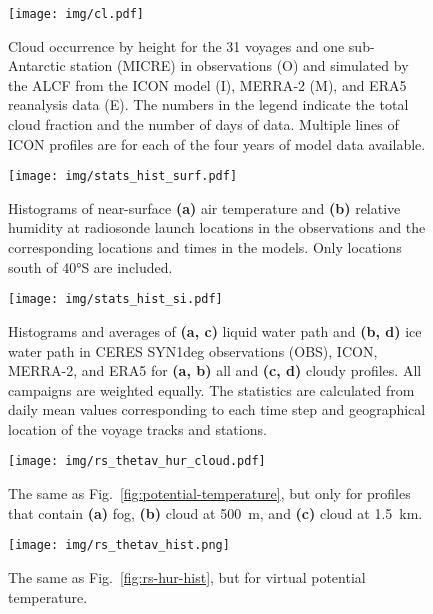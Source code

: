 \documentclass[draft,jgrga]{agutexSI2019}
\begin{document}
\begin{figure}[p!]
\centerline{
\texttt{[image: img/cl.pdf]}
}
\caption{
Cloud occurrence by height for the 31 voyages and one sub-Antarctic station (MICRE) in observations (O) and simulated by the ALCF from the ICON model (I), MERRA‐2 (M), and ERA5 reanalysis data (E). The numbers in the legend indicate the total cloud fraction and the number of days of data. Multiple lines of ICON profiles are for each of the four years of model data available.
}
\label{fig:cloud-occurrence-panel}
\end{figure}

\begin{figure}[p!]
\texttt{[image: img/stats\_hist\_surf.pdf]}
\caption{
Histograms of near-surface \textbf{(a)} air temperature and \textbf{(b)} relative humidity at radiosonde launch locations in the observations and the corresponding locations and times in the models. Only locations south of 40°S are included.
}
\label{fig:stats-hist-surf}
\end{figure}

\begin{figure}[p!]
\texttt{[image: img/stats\_hist\_si.pdf]}
\caption{
Histograms and averages of \textbf{(a, c)} liquid water path and \textbf{(b, d)} ice water path in CERES SYN1deg observations (OBS), ICON, MERRA-2, and ERA5 for \textbf{(a, b)} all and \textbf{(c, d)} cloudy profiles. All campaigns are weighted equally. The statistics are calculated from daily mean values corresponding to each time step and geographical location of the voyage tracks and stations.
}
\label{fig:stats-hist-si}
\end{figure}

\begin{figure}[t]
\centerline{
\texttt{[image: img/rs\_thetav\_hur\_cloud.pdf]}
}
\caption{
The same as Fig.~\ref{fig:potential-temperature}, but only for profiles that contain \textbf{(a)} fog, \textbf{(b)} cloud at 500~m, and \textbf{(c)} cloud at 1.5~km.
}
\label{fig:rs-thetav-hur-cloud}
\end{figure}

\begin{figure}[t]
\centerline{
\texttt{[image: img/rs\_thetav\_hist.png]}
}
\caption{
The same as Fig.~\ref{fig:rs-hur-hist}, but for virtual potential temperature.
}
\label{fig:rs-thetav-hist}
\end{figure}
\end{document}
